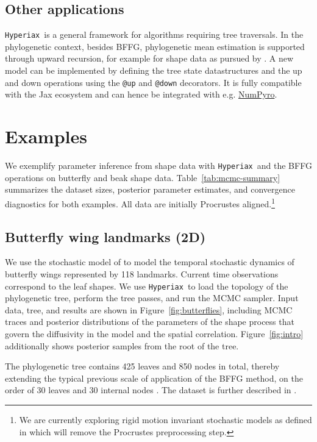 \documentclass[unnumsec,webpdf,contemporary,large]{oup-authoring-template}
\newcommand{\Hyperiax}{\texttt{Hyperiax}}
\newcommand{\revision}[1]{{\color{red} #1}}
\begin{document}
\subsection{Other applications}
\Hyperiax\ is a general framework for algorithms requiring tree traversals. In the phylogenetic context, besides BFFG, phylogenetic mean estimation is supported through upward recursion, for example for shape data as pursued by \citet{severinsen2026diffeomorphic}. \revision{A new model can be implemented by defining the tree state datastructures and the up and down operations using the \texttt{@up} and \texttt{@down} decorators. It is fully compatible with the Jax ecosystem and can hence be integrated with e.g. \href{https://numpyro.com/}{NumPyro}.}

\section{Examples}
We exemplify parameter inference from shape data with \Hyperiax\ and the BFFG operations on butterfly and beak shape data. Table~\ref{tab:mcmc-summary} summarizes the dataset sizes, posterior parameter estimates, and convergence diagnostics for both examples. \revision{All data are initially Procrustes aligned.\footnote{\revision{We are currently exploring rigid motion invariant stochastic models as defined in \cite{joshiLandmarkShapeSpaces2026} which will remove the Procrustes preprocessing step.}}}
\label{sec:examples}

\subsection{Butterfly wing landmarks (2D)}
We use the stochastic model of \citet{stroustrup2026stochastic} to model the temporal stochastic dynamics of butterfly wings represented by 118 landmarks. Current time observations correspond to the leaf shapes. We use \Hyperiax\ to load the topology of the phylogenetic tree, perform the tree passes, and run the MCMC sampler. Input data, tree, and results are shown in Figure~\ref{fig:butterflies}, including MCMC traces and posterior distributions of the parameters of the shape process that govern the diffusivity in the model and the spatial correlation. Figure~\ref{fig:intro} additionally shows posterior samples from the root of the tree.

The phylogenetic tree contains 425 leaves and 850 nodes in total, thereby extending the typical previous scale of application of the BFFG method, on the order of 30 leaves and 30 internal nodes \citep{stroustrup2026stochastic}. The dataset is further described in \cite{severinsen2026stochastic}.
\end{document}
